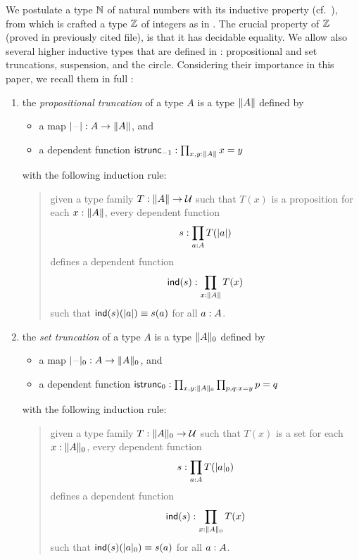 \documentclass[english,a4]{article}
\def\githubpath{\tt\small}
\newcommand{\setTrunc}[1]{\Trunc{#1}_0}
\newcommand{\settrunc}[1]{\trunc{#1}_0}
\begin{document}
We postulate a type $\mathbb{N}$ of natural numbers with its inductive property
(cf.~\cite[Chapter 1.9]{HoTT}), from which is crafted a type $\mathbb{Z}$ of integers
as in \cite[\githubpath core/lib/types/Int.agda]{hott-agda}. The crucial
property of $\mathbb{Z}$ (proved in previously cited file), is that it has decidable
equality. We allow also several higher inductive types that are defined in
\cite{HoTT}: propositional and set truncations, suspension, and the circle.
Considering their importance in this paper, we recall them in full
:
\begin{enumerate}
\item the {\em propositional truncation} of a type $A$ is a type $\lVert A\rVert$
  defined by
  \begin{itemize}
  \item a map $\trunc \blank \from A \to \Trunc A$, and
  \item a dependent function
    $\mathsf{istrunc}_{-1} : \prod_{x,y: \lVert A\rVert} x=y$
  \end{itemize}
  with the following induction rule:
  \begin{quote}
    given a type family $T: \lVert A\rVert \to \mathcal{U}$ such that
    $T(x)$ is a proposition for each $x: \lVert A\rVert$, every
    dependent function
    \begin{displaymath}
      s: \prod_{a: A}T(\lvert a\rvert)
    \end{displaymath}
    defines a dependent function
    \begin{displaymath}
      \operatorname{\mathsf{ind}}(s):\prod_{x: \lVert A\rVert} T(x)
    \end{displaymath}
    such that $\operatorname{\mathsf{ind}}(s)(\lvert a\rvert) \equiv s(a)$ for all $a: A$.
  \end{quote}
\item the {\em set truncation} of a type $A$ is a type $\setTrunc A$
  defined by
  \begin{itemize}
  \item a map $\settrunc \blank \from A \to \setTrunc A$, and
  \item a dependent function
    $\istrunc {0} \from \prod_{x,y\from \setTrunc A}\prod_{p,q: x=y} p = q$
  \end{itemize}
  with the following induction rule:
  \begin{quote}
    given a type family $T\from \setTrunc A \to \UU$ such that
    $T(x)$ is a set for each $x\from \setTrunc A$, every
    dependent function
    \begin{displaymath}
      s\from \prod_{a\from A}T(\settrunc a)
    \end{displaymath}
    defines a dependent function
    \begin{displaymath}
      \ind(s)\from\prod_{x\from \setTrunc A} T(x)
    \end{displaymath}
    such that $\ind(s)(\settrunc a) \jdeq s(a)$ for all $a: A$.
  \end{quote}


\end{enumerate}
\end{document}

